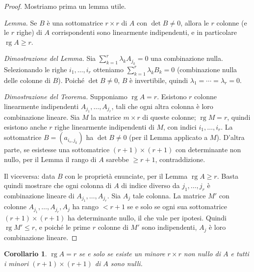 \documentclass[11pt, a4paper]{book}
\theoremstyle{definition}
\theoremstyle{plain}
\newtheorem{corollario}[definizione]{Corollario}
\theoremstyle{remark}
\DeclareMathOperator{\rg}{rg}
\begin{document}
\begin{proof}
Mostriamo prima un lemma utile.

\emph{Lemma.} Se $B$ è una sottomatrice $r\times r$ di $A$ con $\det B \neq 0$, allora le $r$ colonne (e le $r$ righe) di $A$ corrispondenti sono linearmente indipendenti, e in particolare $\rg A \geq r$.

\emph{Dimostrazione del Lemma.} Sia $\sum_{k=1}^r \lambda_k A_{j_k} = 0$ una combinazione nulla. Selezionando le righe $i_1,\ldots,i_r$ otteniamo $\sum_{k=1}^r \lambda_k B_k = 0$ (combinazione nulla delle colonne di $B$). Poiché $\det B \neq 0$, $B$ è invertibile, quindi $\lambda_1 = \cdots = \lambda_r = 0$.

\emph{Dimostrazione del Teorema.} Supponiamo $\rg A = r$. Esistono $r$ colonne linearmente indipendenti $A_{j_1},\ldots,A_{j_r}$, tali che ogni altra colonna è loro combinazione lineare. Sia $M$ la matrice $m\times r$ di queste colonne; $\rg M = r$, quindi esistono anche $r$ righe linearmente indipendenti di $M$, con indici $i_1,\ldots,i_r$. La sottomatrice $B = (a_{i_s,j_k})$ ha $\det B \neq 0$ (per il Lemma applicato a $M$). D'altra parte, se esistesse una sottomatrice $(r+1)\times(r+1)$ con determinante non nullo, per il Lemma il rango di $A$ sarebbe $\geq r+1$, contraddizione.

Il viceversa: data $B$ con le proprietà enunciate, per il Lemma $\rg A \geq r$. Basta quindi mostrare che ogni colonna di $A$ di indice diverso da $j_1,\ldots,j_r$ è combinazione lineare di $A_{j_1},\ldots,A_{j_r}$. Sia $A_j$ tale colonna. La matrice $M'$ con colonne $A_{j_1},\ldots,A_{j_r},A_j$ ha rango $< r+1$ se e solo se ogni sua sottomatrice $(r+1)\times(r+1)$ ha determinante nullo, il che vale per ipotesi. Quindi $\rg M' \leq r$, e poiché le prime $r$ colonne di $M'$ sono indipendenti, $A_j$ è loro combinazione lineare.
\end{proof}

\begin{corollario}
\label{cor:rango-minori}
$\rg A = r$ se e solo se esiste un minore $r\times r$ non nullo di $A$ e tutti i minori $(r+1)\times(r+1)$ di $A$ sono nulli.
\end{corollario}
\end{document}
